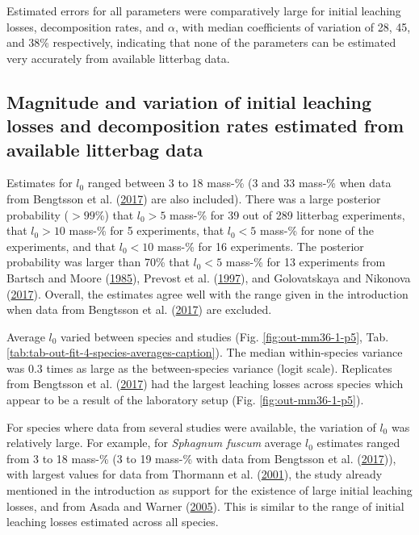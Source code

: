 \documentclass[
  12pt,
]{article}
\begin{document}
Estimated errors for all parameters were comparatively large for initial leaching losses, decomposition rates, and \(\alpha\), with median coefficients of variation of 28, 45, and 38\% respectively, indicating that none of the parameters can be estimated very accurately from available litterbag data.

\hypertarget{out-res-1}{%
\subsection{Magnitude and variation of initial leaching losses and decomposition rates estimated from available litterbag data}\label{out-res-1}}

Estimates for \(l_0\) ranged between 3 to 18 mass-\% (3 and 33 mass-\% when data from Bengtsson et al. (\protect\hyperlink{ref-Bengtsson.2017}{2017}) are also included). There was a large posterior probability (\(>99\)\%) that \(l_0>5\) mass-\% for 39 out of 289 litterbag experiments, that \(l_0>10\) mass-\% for 5 experiments, that \(l_0<5\) mass-\% for none of the experiments, and that \(l_0<10\) mass-\% for 16 experiments. The posterior probability was larger than 70\% that \(l_0<5\) mass-\% for 13 experiments from Bartsch and Moore (\protect\hyperlink{ref-Bartsch.1985}{1985}), Prevost et al. (\protect\hyperlink{ref-Prevost.1997}{1997}), and Golovatskaya and Nikonova (\protect\hyperlink{ref-Golovatskaya.2017}{2017}). Overall, the estimates agree well with the range given in the introduction when data from Bengtsson et al. (\protect\hyperlink{ref-Bengtsson.2017}{2017}) are excluded.

Average \(l_0\) varied between species and studies (Fig. \ref{fig:out-mm36-1-p5}, Tab. \ref{tab:tab-out-fit-4-species-averages-caption}). The median within-species variance was 0.3 times as large as the between-species variance (logit scale). Replicates from Bengtsson et al. (\protect\hyperlink{ref-Bengtsson.2017}{2017}) had the largest leaching losses across species which appear to be a result of the laboratory setup (Fig. \ref{fig:out-mm36-1-p5}).

For species where data from several studies were available, the variation of \(l_0\) was relatively large. For example, for \emph{Sphagnum fuscum} average \(l_0\) estimates ranged from 3 to 18 mass-\% (3 to 19 mass-\% with data from Bengtsson et al. (\protect\hyperlink{ref-Bengtsson.2017}{2017})), with largest values for data from Thormann et al. (\protect\hyperlink{ref-Thormann.2001}{2001}), the study already mentioned in the introduction as support for the existence of large initial leaching losses, and from Asada and Warner (\protect\hyperlink{ref-Asada.2005b}{2005}). This is similar to the range of initial leaching losses estimated across all species.
\end{document}
